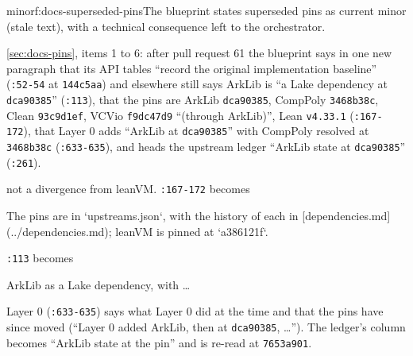 \begin{finding}{minor}{f:docs-superseded-pins}{The blueprint states superseded pins as current}
 minor (stale text), with a technical consequence left to the orchestrator.
 \begin{sloppypar}
\cref{sec:docs-pins}, items 1 to 6: after pull request 61 the blueprint says in one new paragraph that its API tables ``record the original implementation baseline'' (\texttt{:\allowbreak{}52-\allowbreak{}54} at \texttt{144c5aa}) and elsewhere still says ArkLib is ``a Lake dependency at \texttt{dca90385}'' (\texttt{:\allowbreak{}113}), that the pins are ArkLib \texttt{dca90385}, CompPoly \texttt{3468b38c}, Clean \texttt{93c9d1ef}, VCVio \texttt{f9dc47d9} ``(through ArkLib)'', Lean \texttt{v4.\allowbreak{}33.\allowbreak{}1} (\texttt{:\allowbreak{}167-\allowbreak{}172}), that Layer 0 adds ``ArkLib at \texttt{dca90385}'' with CompPoly resolved at \texttt{3468b38c} (\texttt{:\allowbreak{}633-\allowbreak{}635}), and heads the upstream ledger ``ArkLib state at \texttt{dca90385}'' (\texttt{:\allowbreak{}261}).
\end{sloppypar}
 not a divergence from leanVM.
 \texttt{:\allowbreak{}167-\allowbreak{}172} becomes

\begin{srccode}
The pins are in `upstreams.json`, with the history of each in [dependencies.md](../dependencies.md); leanVM is pinned at `a386121f`.
\end{srccode}

\texttt{:\allowbreak{}113} becomes

\begin{srccode}
ArkLib as a Lake dependency, with …
\end{srccode}

\begin{sloppypar}
Layer 0 (\texttt{:\allowbreak{}633-\allowbreak{}635}) says what Layer 0 did at the time and that the pins have since moved (``Layer 0 added ArkLib, then at \texttt{dca90385}, …''). The ledger's column becomes ``ArkLib state at the pin'' and is re-read at \texttt{7653a901}.
\end{sloppypar}


\end{finding}
